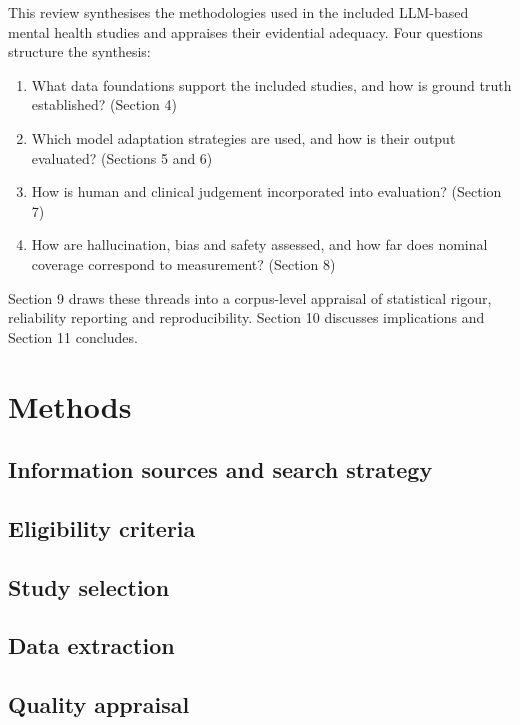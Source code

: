 \documentclass[11pt]{article}
\begin{document}
	This review synthesises the methodologies used in the included LLM-based mental health studies and
	appraises their evidential adequacy. Four questions structure the synthesis:
	
	\begin{enumerate}[itemsep=1pt,topsep=3pt]
		\item What data foundations support the included studies, and how is ground truth established?
		(Section 4)
		\item Which model adaptation strategies are used, and how is their output evaluated?
		(Sections 5 and 6)
		\item How is human and clinical judgement incorporated into evaluation? (Section 7)
		\item How are hallucination, bias and safety assessed, and how far does nominal coverage
		correspond to measurement? (Section 8)
	\end{enumerate}
	
	Section 9 draws these threads into a corpus-level appraisal of statistical rigour, reliability
	reporting and reproducibility. Section 10 discusses implications and Section 11 concludes.
	
	\section{Methods}
	
	
	\subsection{Information sources and search strategy}
	
	
	
	\subsection{Eligibility criteria}
	
	
	
	\subsection{Study selection}
	
	
	
	\subsection{Data extraction}
	
	
	
	\subsection{Quality appraisal}
	
\end{document}
